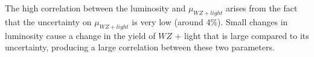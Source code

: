 The high correlation between the luminosity and $\mu_{WZ+light}$ arises from the fact that the uncertainty on $\mu_{WZ+light}$ is very low (around 4\%). Small changes in luminosity cause a change in the yield of $WZ$ + light that is large compared to its uncertainty, producing a large correlation between these two parameters.



%        





